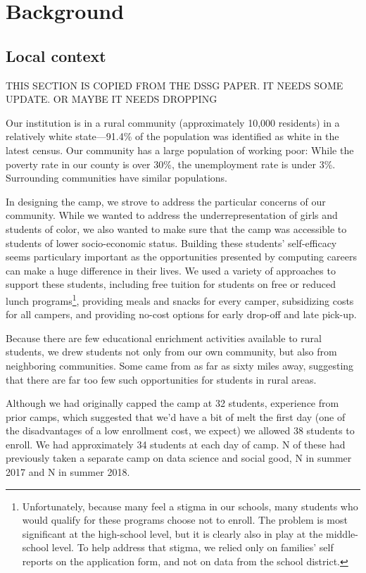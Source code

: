 \section{Background}

\subsection{Local context}

THIS SECTION IS COPIED FROM THE DSSG PAPER.  IT NEEDS SOME UPDATE.
OR MAYBE IT NEEDS DROPPING

Our institution is in a rural community (approximately 10,000
residents) in a relatively white state---91.4\% of the population was
identified as white in the latest census.  Our community has a large
population of working poor: While the poverty rate in our county
is over 30\%, the unemployment rate is under 3\%.  Surrounding
communities have similar populations.

In designing the camp, we strove to address the particular concerns
of our community.  While we wanted to address the underrepresentation
of girls and students of color, we also wanted to make sure that
the camp was accessible to students of lower socio-economic status.
Building these students' self-efficacy seems particulary important
as the opportunities presented by computing careers can make a huge
difference in their lives.  We used a variety of approaches to
support these students, including free tuition for students on free
or reduced lunch programs\footnote{Unfortunately, because many feel
a stigma in our schools, many students who would qualify for these
programs choose not to enroll.  The problem is most significant at
the high-school level, but it is clearly also in play at the
middle-school level.  To help address that stigma, we relied only
on families' self reports on the application form, and not on data
from the school district.}, providing meals and snacks for every
camper, subsidizing costs for all campers, and providing no-cost
options for early drop-off and late pick-up.

Because there are few educational enrichment activities available
to rural students, we drew students not only from our own community,
but also from neighboring communities.  Some came from as far as
sixty miles away, suggesting that there are far too few such
opportunities for students in rural areas.

Although we had originally capped the camp at 32 students, experience
from prior camps, which suggested that we'd have a bit of melt the
first day (one of the disadvantages of a low enrollment cost, we
expect) we allowed 38 students to enroll.  We had approximately 34
students at each day of camp.  N of these had previously taken a
separate camp on data science and social good, N in summer 2017
and N in summer 2018.

